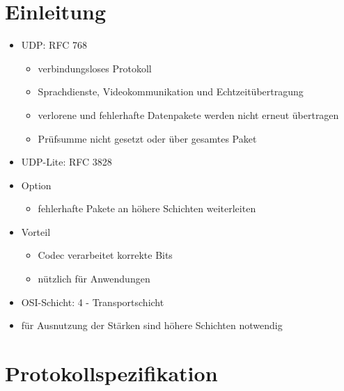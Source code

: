 \documentclass{beamer}
\begin{document}
\section{Einleitung}
\begin{frame}
\begin{itemize}
\item UDP: RFC 768
	\begin{itemize}
	\item verbindungsloses Protokoll
	\item Sprachdienste, Videokommunikation und Echtzeitübertragung
	\item verlorene und fehlerhafte Datenpakete werden nicht erneut übertragen
	\item Prüfsumme nicht gesetzt oder über gesamtes Paket
	\end{itemize}
\end{itemize}
\par
\begin{itemize}
\item UDP-Lite: RFC 3828
\item Option
	\begin{itemize}
	\item fehlerhafte Pakete an höhere Schichten weiterleiten
	\end{itemize}
\item Vorteil
	\begin{itemize}
	\item Codec verarbeitet korrekte Bits
	\item nützlich für Anwendungen
	\end{itemize}
\end{itemize}
\par
\begin{itemize}
\item OSI-Schicht: 4 - Transportschicht
\item für Ausnutzung der Stärken sind höhere Schichten notwendig
\end{itemize}
\end{frame}


\section{Protokollspezifikation}
\end{document}
